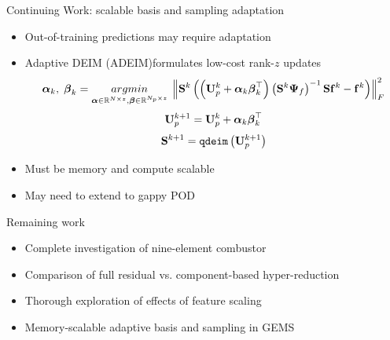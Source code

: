 \documentclass[]{beamer}
\begin{document}
\begin{frame}{Continuing Work: scalable basis and sampling adaptation}
	\begin{itemize}
		\item Out-of-training predictions may require adaptation
		\item Adaptive DEIM (ADEIM)\footnotemark[18] formulates low-cost rank-$z$ updates
		\small
		\begin{equation*}
			\boldsymbol{\alpha}_{\newtonIdx}, \; \boldsymbol{\beta}_{\newtonIdx} = \argmin{\boldsymbol{\alpha} \in \mathbb{R}^{\numDOF \times z}, \boldsymbol{\beta} \in \mathbb{R}^{\numPrimModes \times z}} \norm{\sampMat^{\newtonIdx} \left( \left( \primTrial^{\newtonIdx} + \boldsymbol{\alpha}_{\newtonIdx} \boldsymbol{\beta}_{\newtonIdx}^\top \right) \left(\sampMat^{\newtonIdx} \deimBasisRhs\right)^{-1} \sampMat \rhsDataMat^{\newtonIdx} - \rhsDataMat^{\newtonIdx} \right)}_F^2
		\end{equation*}
		\normalsize
		\begin{equation*}
			\primTrial^{\newtonIdx + 1} = \primTrial^{\newtonIdx} + \boldsymbol{\alpha}_{\newtonIdx} \boldsymbol{\beta}_{\newtonIdx}^\top
		\end{equation*}
		\begin{equation*}
			\sampMat^{\newtonIdx+1} = \texttt{qdeim}\left( \primTrial^{\newtonIdx + 1} \right)
		\end{equation*}
		\item Must be memory and compute scalable
		\item May need to extend to gappy POD
	\end{itemize}
\end{frame}

\begin{frame}{Remaining work}
	\begin{itemize}
		\item Complete investigation of nine-element combustor
		\item Comparison of full residual vs. component-based hyper-reduction
		\item Thorough exploration of effects of feature scaling
		\item Memory-scalable adaptive basis and sampling in GEMS
	\end{itemize}
\end{frame}
\end{document}
